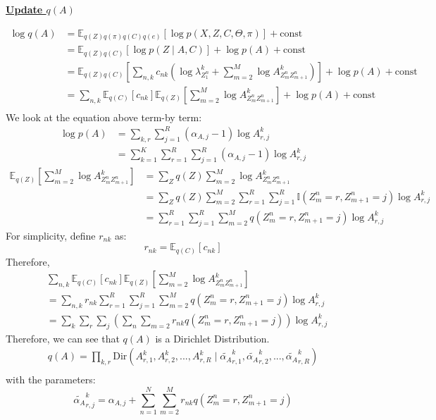 \documentclass[12pt]{article}
\newenvironment{problem}[2][Problem]{\begin{trivlist}
\item[\hskip \labelsep {\bfseries #1}\hskip \labelsep {\bfseries #2.}]}{\end{trivlist}}
\begin{document}
\begin{problem}{2.8.24}
\begin{flushleft}
\textbf{\underline{Update $q(A)$}}
\end{flushleft}

\begin{align*}
    \log q(A) &= \mathbb{E}_{q(Z)q(\pi)q(C)q(e)}[\log p(X, Z, C, \Theta, \pi)] + \text{const} \\
    &= \mathbb{E}_{q(Z)q(C)}[\log p(Z\mid A, C)] + \log p(A)+ \text{const} \\
    &= \mathbb{E}_{q(Z)q(C)}[\sum_{n,k}c_{nk}(\log\lambda^k_{Z^n_{1}} + \sum_{m=2}^{M}\log A^k_{Z^n_{m}Z^n_{m+1}})] 
        + \log p(A)+ \text{const} \\
    &= \sum_{n,k}\mathbb{E}_{q(C)}[c_{nk}]\mathbb{E}_{q(Z)}[\sum_{m=2}^{M}\log A^k_{Z^n_{m}Z^n_{m+1}}] 
        + \log p(A)+ \text{const} \\
\end{align*}
We look at the equation above term-by term:
\begin{align*}
    \log p(A) &= \sum_{k,r}\sum_{j=1}^{R} (\alpha_{A,j} - 1)\log A^k_{r,j} \\
    &= \sum_{k=1}^{K}\sum_{r=1}^{R}\sum_{j=1}^{R} (\alpha_{A,j} - 1)\log A^k_{r,j}
\end{align*}
\begin{align*}
    \mathbb{E}_{q(Z)}[\sum_{m=2}^{M}\log A^k_{Z^n_{m}Z^n_{m+1}}] &=
    \sum_{Z}q(Z)\sum_{m=2}^{M}\log A^k_{Z^n_{m}Z^n_{m+1}} \\
    &= \sum_{Z}q(Z)\sum_{m=2}^{M}\sum_{r=1}^{R}\sum_{j=1}^{R}\mathbb{I}(Z^n_{m}=r, Z^n_{m+1}=j)\log A^k_{r,j} \\
    &= \sum_{r=1}^{R}\sum_{j=1}^{R}\sum_{m=2}^{M}q(Z^n_{m}=r, Z^n_{m+1}=j)\log A^k_{r,j}
\end{align*}
For simplicity, define $r_{nk}$ as:
\begin{equation}
    r_{nk} = \mathbb{E}_{q(C)}[c_{nk}] 
\end{equation}
Therefore,
\begin{align*}
    &\sum_{n,k}\mathbb{E}_{q(C)}[c_{nk}]\mathbb{E}_{q(Z)}[\sum_{m=2}^{M}\log A^k_{Z^n_{m}Z^n_{m+1}}] \\
    &= \sum_{n,k} r_{nk} \sum_{r=1}^{R}\sum_{j=1}^{R}\sum_{m=2}^{M}q(Z^n_{m}=r, Z^n_{m+1}=j)\log A^k_{r,j} \\
    &= \sum_{k}\sum_{r}\sum_{j}(\sum_{n}\sum_{m=2}r_{nk} q(Z^n_{m}=r, Z^n_{m+1}=j))\log A^k_{r,j}
\end{align*}
Therefore, we can see that $q(A)$ is a Dirichlet Distribution.
\begin{align*}
    q(A) = \prod_{k,r} \mathrm{Dir}(A^k_{r,1}, A^k_{r,2}, ..., A^k_{r,R}
        \mid \tilde{\alpha_{A}}^k_{r,1},\tilde{\alpha_{A}}^k_{r,2},...,\tilde{\alpha_{A}}^k_{r,R}) \\
\end{align*}
with the parameters:
\begin{equation}
    \tilde{\alpha_{A}}^k_{r,j} = \alpha_{A,j} + \sum_{n=1}^{N}\sum_{m=2}^{M}r_{nk} q(Z^n_{m}=r, Z^n_{m+1}=j)
\end{equation}


\end{problem}
\end{document}
